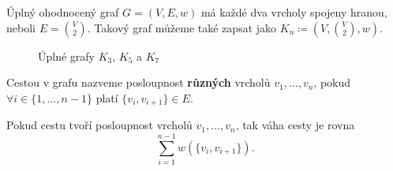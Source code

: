 \begin{definition}
    \label{definice:uplny_ohodnoceny_graf}
    Úplný ohodnocený graf $G = (V, E, w)$ má každé dva vrcholy spojeny hranou, neboli $E = \binom{V}{2}$. Takový graf můžeme také zapsat jako $K_n \coloneqq (V,\binom{V}{2},w)$.
    \begin{figure}[h]
        \centering
        \begin{subfigure}[b]{0.3\textwidth}
            \centering
        \end{subfigure}
        \begin{subfigure}[b]{0.3\textwidth}
            \centering
        \end{subfigure}
        \begin{subfigure}[b]{0.3\textwidth}
            \centering
        \end{subfigure}
        \caption{Úplné grafy $K_3$, $K_5$ a $K_7$}
        \label{obr:uplne_ohodnocene_grafy}

    \end{figure}
\end{definition}

\begin{definition}[Cesta]
    \label{definice:cesta}
    Cestou v grafu nazveme posloupnost \textbf{různých} vrcholů $v_1, \ldots, v_n$, pokud $\forall i \in \{1,\ldots, n-1\}$ platí $\{v_i, v_{i+1}\} \in E$.  
\end{definition}

\begin{definition}
    \label{definice:vaha_cesty}
    Pokud cestu tvoří posloupnost vrcholů $v_1, \ldots, v_n$, tak váha cesty je rovna \[ \sum_{i=1}^{n-1}w(\{v_i, v_{i+1}\}). \]
    
\end{definition}

